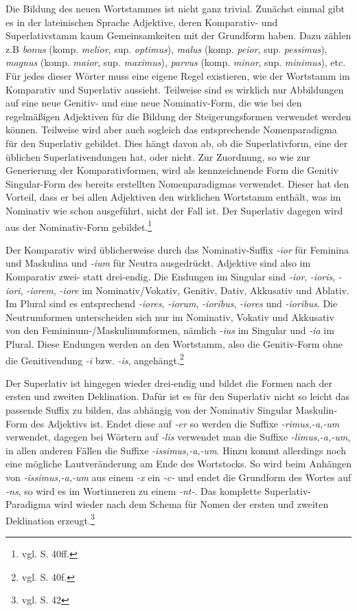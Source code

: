 \documentclass[fontsize=12pt,abstract=on,titlepage,bibliography=totoc,ngerman,listof=totoc]{scrreprt}
\begin{document}
Die Bildung des neuen Wortstammes ist nicht ganz trivial. Zunächst einmal gibt es in der lateinischen Sprache Adjektive, deren Komparativ- und Superlativstamm kaum Gemeinsamkeiten mit der Grundform haben. Dazu zählen z.B \textit{bonus} (komp. \textit{melior}, sup. \textit{optimus}), \textit{malus} (komp. \textit{peior}, sup. \textit{pessimus}), \textit{magnus} (komp. \textit{maior}, sup. \textit{maximus}), \textit{parvus} (komp. \textit{minor}, sup. \textit{minimus}), etc. Für jedes dieser Wörter muss eine eigene Regel existieren, wie der Wortstamm im Komparativ und Superlativ aussieht. Teilweise sind es wirklich nur Abbildungen auf eine neue Genitiv- und eine neue Nominativ-Form, die wie bei den regelmäßigen Adjektiven für die Bildung der Steigerungsformen verwendet werden können. Teilweise wird aber auch sogleich das entsprechende Nomenparadigma für den Superlativ gebildet. Dies hängt davon ab, ob die Superlativform, eine der üblichen Superlativendungen hat, oder nicht. Zur Zuordnung, so wie zur Generierung der Komparativformen, wird als kennzeichnende Form die Genitiv Singular-Form des bereits erstellten Nomenparadigmas verwendet. Dieser hat den Vorteil, dass er bei allen Adjektiven den wirklichen Wortstamm enthält, was im Nominativ wie schon ausgeführt, nicht der Fall ist. Der Superlativ dagegen wird aus der Nominativ-Form gebildet.\footnote{vgl. \cite{BAYER-LINDAUER1994} S. 40ff.} \par
Der Komparativ wird üblicherweise durch das Nominativ-Suffix \textit{-ior} für Feminina und Maskulina und \textit{-ium} für Neutra ausgedrückt. Adjektive sind also im Komparativ zwei- statt drei-endig. Die Endungen im Singular sind \textit{-ior}, \textit{-ioris}, \textit{-iori}, \textit{-iorem}, \textit{-iore} im Nominativ/Vokativ, Genitiv, Dativ, Akkusativ und Ablativ. Im Plural sind es entsprechend \textit{-iores}, \textit{-iorum}, \textit{-ioribus}, \textit{-iores} und \textit{-ioribus}. Die Neutrumformen unterscheiden sich nur im Nominativ, Vokativ und Akkusativ von den Femininum-/Maskulinumformen, nämlich \textit{-ius} im Singular und \textit{-ia} im Plural. Diese Endungen werden an den Wortstamm, also die Genitiv-Form ohne die Genitivendung \textit{-i} bzw. \textit{-is}, angehängt.\footnote{vgl. \cite{BAYER-LINDAUER1994} S. 40f.} \par
Der Superlativ ist hingegen wieder drei-endig und bildet die Formen nach der ersten und zweiten Deklination. Dafür ist es für den Superlativ nicht so leicht das passende Suffix zu bilden, das abhängig von der Nominativ Singular Maskulin-Form des Adjektivs ist. Endet diese auf \textit{-er} so werden die Suffixe \textit{-rimus,-a,-um} verwendet, dagegen bei Wörtern auf \textit{-lis} verwendet man die Suffixe \textit{-limus,-a,-um}, in allen anderen Fällen die Suffixe \textit{-issimus,-a,-um}. Hinzu kommt allerdings noch eine mögliche Lautveränderung am Ende des Wortstocks. So wird beim Anhängen von \textit{-issimus,-a,-um} aus einem \textit{-x} ein \textit{-c-} und endet die Grundform des Wortes auf \textit{-ns}, so wird es im Wortinneren zu einem \textit{-nt-}. Das komplette Superlativ-Paradigma wird wieder nach dem Schema für Nomen der ersten und zweiten Deklination erzeugt.\footnote{vgl. \cite{BAYER-LINDAUER1994} S. 42} \par
\end{document}
